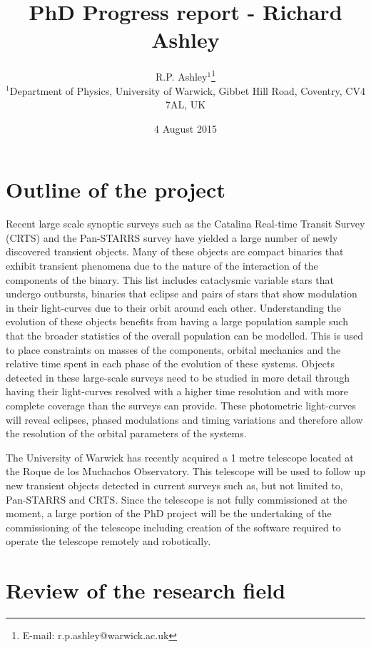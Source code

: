 \documentclass[a4paper,fleqn,usenatbib]{mnras}
\title[Richard Ashley - PhD project]{PhD Progress report - Richard Ashley}
\author[R.P. Ashley et al.]{
R.P. Ashley$^{1}$\thanks{E-mail: r.p.ashley@warwick.ac.uk}\\
$^{1}$Department of Physics, University of Warwick, Gibbet Hill Road, Coventry, CV4 7AL, UK\\
}
\date{4 August 2015}
\begin{document}
\label{firstpage}
\pagerange{\pageref{firstpage}--\pageref{lastpage}}
\maketitle




\section{Outline of the project}
Recent large scale synoptic surveys such as the Catalina Real-time Transit Survey (CRTS)  and the Pan-STARRS survey have yielded a large number of newly discovered transient objects. Many of these objects are compact binaries that exhibit transient phenomena due to the nature of the interaction of the components of the binary. This list includes cataclysmic variable stars that undergo outbursts, binaries that eclipse and pairs of stars that show modulation in their light-curves due to their orbit around each other. Understanding the evolution of these objects benefits from having a large population sample such that the broader statistics of the overall population can be modelled. This is used to place constraints on masses of the components, orbital mechanics and the relative time spent in each phase of the evolution of these systems. Objects detected in these large-scale surveys need to be studied in more detail through having their light-curves resolved with a higher time resolution and with more complete coverage than the surveys can provide. These photometric light-curves will reveal eclipses, phased modulations and timing variations and therefore allow the resolution of the orbital parameters of the systems. 

The University of Warwick has recently acquired a 1 metre telescope located at the Roque de los Muchachos Observatory. This telescope will be used to follow up new transient objects detected in current surveys such as, but not limited to, Pan-STARRS and CRTS. Since the telescope is not fully commissioned at the moment, a large portion of the PhD project will be the undertaking of the commissioning of the telescope including creation of the software required to operate the telescope remotely and robotically. 

\section{Review of the research field}
\end{document}

